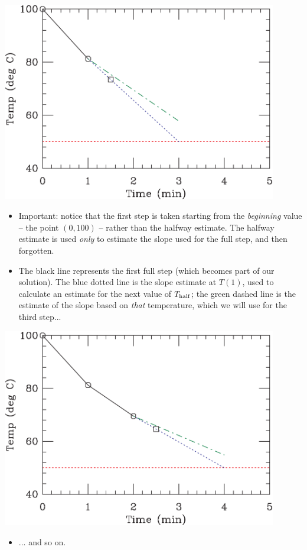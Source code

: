 \documentclass[12ampt]{article}
\begin{document}
\begin{minipage}{0.5\textwidth}
\includegraphics[width=0.9\textwidth]{rk1-crop.pdf}
\end{minipage}
\begin{minipage}{0.5\textwidth}
\begin{itemize}
\item Important: notice that the first step is taken starting from the 
{\it beginning} value -- the point $(0, 100)$ -- rather than the halfway estimate.
The halfway estimate is used {\it only} to estimate the slope used for the full
step, and then forgotten. 
\item The black line represents the first full step (which becomes part of our
solution). The blue dotted line is the slope estimate at $T(1)$, used to calculate
an estimate for the next value of $T_{\rm half}$; the green dashed line is the
estimate of the slope based on {\it that} temperature, which we will use for the 
third step...
\end{itemize}
\end{minipage}


\begin{minipage}{0.5\textwidth}
\includegraphics[width=0.9\textwidth]{rk2-crop.pdf}
\end{minipage}
\begin{minipage}{0.5\textwidth}
\begin{itemize}
\item ... and so on.
\end{itemize}
\end{minipage}
\end{document}
